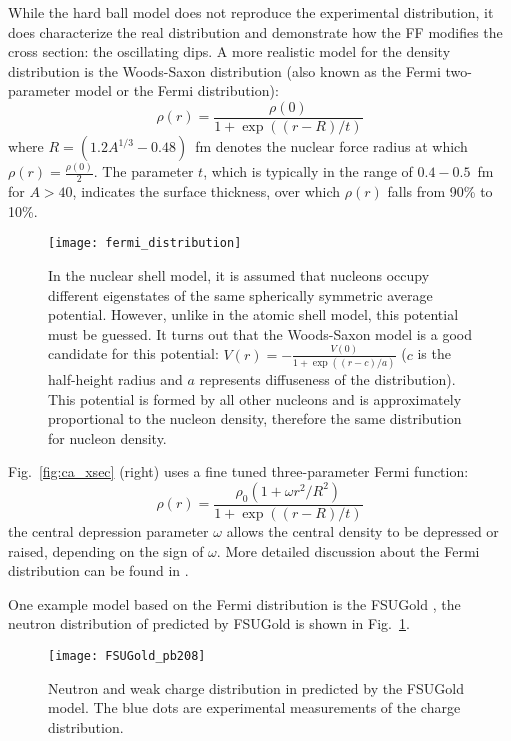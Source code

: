 While the hard ball model does not reproduce the experimental distribution, it does
characterize the real distribution and demonstrate how the FF modifies the cross section:
the oscillating dips. A more realistic model for the density distribution is the
Woods-Saxon distribution (also known as the Fermi two-parameter model or the Fermi
distribution):
\begin{equation}
    \rho(r) = \frac{\rho(0)}{1 + \exp((r-R)/t)}
\end{equation}
where $R = (1.2A^{1/3} - 0.48)$~fm denotes the nuclear force radius at which 
$\rho(r) = \frac{\rho(0)}{2}$. The parameter $t$, which is typically in
the range of $0.4-0.5$~fm for  $A > 40$, indicates the surface thickness, 
over which $\rho(r)$ falls from 90\% to 10\%.
\begin{figure}[!h]
    \centering
    \texttt{[image: fermi\_distribution]}
    \caption[fermi distribution]
    {In the nuclear shell model, it is assumed that nucleons occupy 
    different eigenstates of the same spherically symmetric average potential.
    However, unlike in the atomic shell model, this potential must be guessed. 
    It turns out that the Woods-Saxon model is a good candidate for this potential: 
    $V(r) = -\frac{V(0)}{1+\exp((r-c)/a)}$ ($c$ is the half-height radius and $a$ represents
    diffuseness of the distribution). This potential is formed
    by all other nucleons and is approximately proportional to the nucleon density, 
    therefore the same distribution for nucleon density.} 
\end{figure}

Fig.~\ref{fig:ca_xsec} (right) uses a fine tuned three-parameter Fermi function:
\begin{equation}
    \rho(r) = \frac{\rho_0(1 + \omega r^2/R^2)}{1 + \exp((r-R)/t)}
    \label{eq:3-para_Fermi}
\end{equation}
the central depression parameter $\omega$ allows the central density to be depressed
or raised, depending on the sign of $\omega$. More detailed discussion about the Fermi 
distribution can be found in \cite{Maximon:1966sqn}.

One example model based on the Fermi distribution is the FSUGold \cite{PhysRevLett.95.122501},
the neutron distribution of \Pb predicted by FSUGold is shown in Fig.~\ref{fig:FSUGold_pb208}.
\begin{figure}[!h]
    \centering
    \texttt{[image: FSUGold\_pb208]}
    \caption[Neutron distribution from FSUGold]
    {Neutron and weak charge distribution in \Pb predicted by the FSUGold model.
    The blue dots are experimental measurements of the charge distribution.}
    \label{fig:FSUGold_pb208}
\end{figure}

